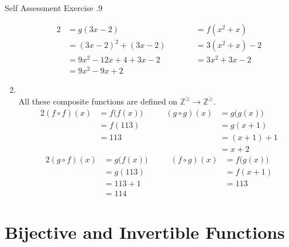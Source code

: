 \documentclass[../notes.tex]{subfiles}
\begin{document}
\begin{exercise}{Self Assessment Exercise \thechapter.9}
\begin{enumerate}[label=(\alph*)]
\begin{alignat*}{2}
							&= g(3x - 2) \qquad & &= f\left(x^{2} + x\right)\\
							&= (3x - 2)^{2} + (3x - 2) \qquad & &= 3\left(x^{2} + x\right) - 2\\
							&= 9x^{2} - 12x + 4 + 3x - 2 \qquad & &= 3x^{2} + 3x - 2\\
							&= 9x^{2} - 9x + 2
						\end{alignat*}
					\pagebreak
					\item {}\\
						All these composite functions are defined on $\mathbb{Z}^{\geq} \rightarrow \mathbb{Z}^{\geq}$.
						\begin{alignat*}{2}
							(f \circ f)(x) &= f\bigl(f(x)\bigr) \qquad & (g \circ g)(x) &= g\bigl(g(x)\bigr)\\
							&= f(113) \qquad & &= g(x + 1)\\
							&= 113 \qquad & &= (x + 1) + 1\\
							& \qquad & &= x + 2
						\end{alignat*}
						\begin{alignat*}{2}
							(g \circ f)(x) &= g\bigl(f(x)\bigr) \qquad & (f \circ g)(x) &= f\bigl(g(x)\bigr)\\
							&= g(113) \qquad & &= f(x + 1)\\
							&= 113 + 1 \qquad & &= 113\\
							&= 114
						\end{alignat*}
				\end{enumerate}
			\end{exercise}
		\section{Bijective and Invertible Functions}
\end{document}
